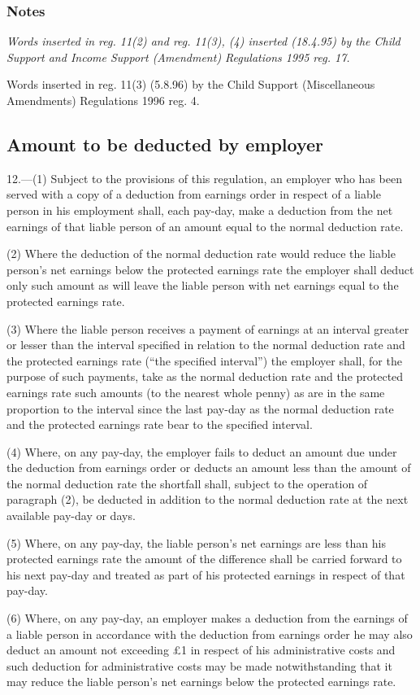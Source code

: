 \documentclass[a4paper]{article}
\newcommand\amendment[1]{\subsubsection*{Notes}{\itshape\frenchspacing\footnotesize #1 \par}}
\begin{document}
\amendment{
Words inserted in reg. 11(2) and reg. 11(3), (4) inserted (18.4.95) by the Child Support and Income Support (Amendment) Regulations 1995 reg. 17.

Words inserted in reg. 11(3) (5.8.96) by the Child Support (Miscellaneous Amendments) Regulations 1996 reg. 4.
}

\subsection[12. Amount to be deducted by employer]{Amount to be deducted by employer}

12.—(1) Subject to the provisions of this regulation, an employer who has been served with a copy of a deduction from earnings order in respect of a liable person in his employment shall, each pay-day, make a deduction from the net earnings of that liable person of an amount equal to the normal deduction rate.

(2) Where the deduction of the normal deduction rate would reduce the liable person’s net earnings below the protected earnings rate the employer shall deduct only such amount as will leave the liable person with net earnings equal to the protected earnings rate.

(3) Where the liable person receives a payment of earnings at an interval greater or lesser than the interval specified in relation to the normal deduction rate and the protected earnings rate (“the specified interval”) the employer shall, for the purpose of such payments, take as the normal deduction rate and the protected earnings rate such amounts (to the nearest whole penny) as are in the same proportion to the interval since the last pay-day as the normal deduction rate and the protected earnings rate bear to the specified interval.

(4) Where, on any pay-day, the employer fails to deduct an amount due under the deduction from earnings order or deducts an amount less than the amount of the normal deduction rate the shortfall shall, subject to the operation of paragraph (2), be deducted in addition to the normal deduction rate at the next available pay-day or days.

(5) Where, on any pay-day, the liable person’s net earnings are less than his protected earnings rate the amount of the difference shall be carried forward to his next pay-day and treated as part of his protected earnings in respect of that pay-day.

(6) Where, on any pay-day, an employer makes a deduction from the earnings of a liable person in accordance with the deduction from earnings order he may also deduct an amount not exceeding £1 in respect of his administrative costs and such deduction for administrative costs may be made notwithstanding that it may reduce the liable person’s net earnings below the protected earnings rate.
\end{document}
